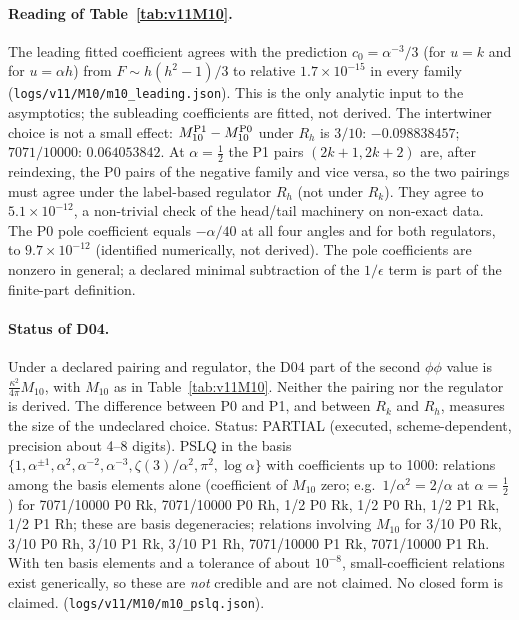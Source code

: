 \documentclass[11pt,a4paper]{article}
\newcommand{\loc}[1]{\nolinkurl{#1}}
\newcommand{\PARTIAL}{\textsf{PARTIAL}}
\theoremstyle{plain}
\theoremstyle{definition}
\theoremstyle{remark}
\numberwithin{equation}{section}
\begin{document}
\paragraph{Reading of Table~\ref{tab:v11M10}.} The leading fitted coefficient agrees with the prediction \(c_0=\alpha^{-3}/3\) (for \(u=k\) and for \(u=\alpha h\)) from \(F\sim h(h^2-1)/3\) to relative \(1.7\times10^{-15}\) in every family (\loc{logs/v11/M10/m10_leading.json}). This is the only analytic input to the asymptotics; the subleading coefficients are fitted, not derived.
The intertwiner choice is not a small effect: \(M_{10}^{\rm P1}-M_{10}^{\rm P0}\) under \(R_h\) is \(3/10\): \(-0.098838457\); \(7071/10000\): \(0.064053842\).
At \(\alpha=\tfrac12\) the P1 pairs \((2k+1,2k+2)\) are, after reindexing, the P0 pairs of the negative family and vice versa, so the two pairings must agree under the label-based regulator \(R_h\) (not under \(R_k\)). They agree to \(5.1\times10^{-12}\), a non-trivial check of the head/tail machinery on non-exact data.
The P0 pole coefficient equals \(-\alpha/40\) at all four angles and for both regulators, to \(9.7\times10^{-12}\) (identified numerically, not derived).
The pole coefficients are nonzero in general; a declared minimal subtraction of the \(1/\epsilon\) term is part of the finite-part definition.

\paragraph{Status of D04.} Under a declared pairing and regulator,
the D04 part of the second \(\phi\phi\) value is
\(\tfrac{\kappa^2}{4\pi}M_{10}\), with \(M_{10}\) as in
Table~\ref{tab:v11M10}. Neither the pairing nor the regulator is
derived. The difference between P0 and P1, and between \(R_k\) and
\(R_h\), measures the size of the undeclared choice. Status:
\PARTIAL{} (executed, scheme-dependent, precision about 4--8
digits). PSLQ in the basis
\(\{1,\alpha^{\pm1},\alpha^2,\alpha^{-2},\alpha^{-3},\zeta(3)/\alpha^2,\pi^2,\log\alpha\}\)
with coefficients up to 1000: relations among the basis elements alone (coefficient of \(M_{10}\) zero; e.g.\ \(1/\alpha^2=2/\alpha\) at \(\alpha=\tfrac12\)) for 7071/10000 P0 Rk, 7071/10000 P0 Rh, 1/2 P0 Rk, 1/2 P0 Rh, 1/2 P1 Rk, 1/2 P1 Rh; these are basis degeneracies; relations involving \(M_{10}\) for 3/10 P0 Rk, 3/10 P0 Rh, 3/10 P1 Rk, 3/10 P1 Rh, 7071/10000 P1 Rk, 7071/10000 P1 Rh. With ten basis elements and a tolerance of about \(10^{-8}\), small-coefficient relations exist generically, so these are \emph{not} credible and are not claimed. No closed form is claimed.
(\loc{logs/v11/M10/m10_pslq.json}).
\end{document}
